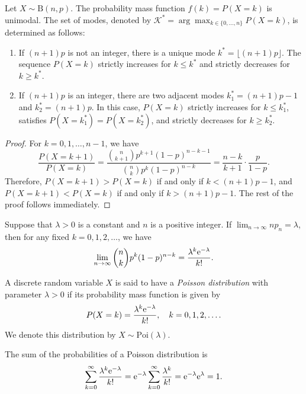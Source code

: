 \begin{proposition}
  Let \(X \sim \mathrm{B}(n, p)\). The probability mass function \(f(k) = P(X = k)\) is unimodal. The set of modes, denoted by \(\mathcal{K}^* = \arg\max_{k \in \{0, \dots, n\}} P(X = k)\), is determined as follows:
  \begin{enumerate}
    \item If \((n+1)p\) is not an integer, there is a unique mode \(k^* = \lfloor (n+1)p \rfloor\). The sequence \(P(X=k)\) strictly increases for \(k \le k^*\) and strictly decreases for \(k \ge k^*\).
    \item If \((n+1)p\) is an integer, there are two adjacent modes \(k_1^* = (n+1)p - 1\) and \(k_2^* = (n+1)p\). In this case, \(P(X=k)\) strictly increases for \(k \le k_1^*\), satisfies \(P(X=k_1^*) = P(X=k_2^*)\), and strictly decreases for \(k \ge k_2^*\).
  \end{enumerate}
\end{proposition}
\begin{proof}
  For \(k = 0, 1, \dots, n-1\), we have
  \[
    \frac{P(X = k + 1)}{P(X = k)} = \frac{\binom{n}{k + 1} p^{k + 1} (1 - p)^{n - k - 1}}{\binom{n}{k} p^k (1 - p)^{n - k}} = \frac{n - k}{k + 1} \cdot \frac{p}{1 - p}.
  \]
  Therefore, \(P(X = k + 1) > P(X = k)\) if and only if \(k < (n + 1)p - 1\), and \(P(X = k + 1) < P(X = k)\) if and only if \(k > (n + 1)p - 1\). The rest of the proof follows immediately. \qedhere
\end{proof}

\begin{theorem}
  Suppose that \(\lambda > 0\) is a constant and \(n\) is a positive integer. If \(\lim_{n \to \infty} np_n = \lambda\), then for any fixed \(k = 0, 1, 2, \dots\), we have
  \[
    \lim_{n \to \infty} \binom{n}{k} p^k (1 - p)^{n - k} = \frac{\lambda^k \mathrm{e}^{-\lambda}}{k!}.
  \]
\end{theorem}

\begin{definition}
  A discrete random variable \(X\) is said to have a \emph{Poisson distribution} with parameter \(\lambda > 0\) if its probability mass function is given by
  \[
    P(X = k) = \frac{\lambda^k \mathrm{e}^{-\lambda}}{k!}, \quad k = 0, 1, 2, \dots.
  \]
  We denote this distribution by \(X \sim \mathrm{Poi}(\lambda)\).
\end{definition}

The sum of the probabilities of a Poisson distribution is
\[
  \sum_{k = 0}^\infty \frac{\lambda^k \mathrm{e}^{-\lambda}}{k!} = \mathrm{e}^{-\lambda} \sum_{k = 0}^\infty \frac{\lambda^k}{k!} = \mathrm{e}^{-\lambda} \mathrm{e}^{\lambda} = 1.
\]

